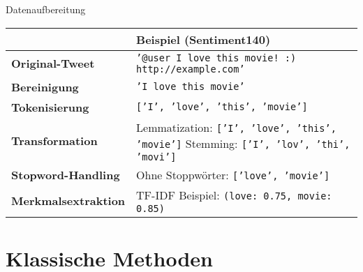 \documentclass[aspectratio=169]{beamer} %
\begin{document}
\begin{frame}{Datenaufbereitung}
  \fontsize{10pt}{12pt}\selectfont
  \vspace{0.3cm}

 \begin{table}[]
      \centering
      \renewcommand{\arraystretch}{1.2}
      \begin{tabular}{l|p{7.5cm}}
          \hline
          & \textbf{Beispiel (Sentiment140)} \\
          \hline
          \textbf{Original-Tweet} & \texttt{'@user I love this movie! :) http://example.com'} \\
          \hline
          \textbf{Bereinigung} & \texttt{'I love this movie'} \\
          \hline
          \textbf{Tokenisierung} & \texttt{['I', 'love', 'this', 'movie']} \\
          \hline
          \textbf{Transformation} & Lemmatization: \texttt{['I', 'love', 'this', 'movie']} \newline
          Stemming: \texttt{['I', 'lov', 'thi', 'movi']} \\
          \hline
          \textbf{Stopword-Handling} & Ohne Stoppwörter: \texttt{['love', 'movie']} \\
          \hline
          \textbf{Merkmalsextraktion} & TF-IDF Beispiel: \newline
          \texttt{(love: 0.75, movie: 0.85)} \\
          \hline
      \end{tabular}
  \end{table}

\end{frame}

\section{Klassische Methoden}
\end{document}
